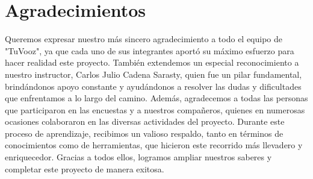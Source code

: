 \documentclass[12pt, a4paper, twocolumn]{article}
\begin{document}
\section{Agradecimientos}
Queremos expresar nuestro más sincero agradecimiento a todo el equipo de "TuVooz", ya que cada uno de sus integrantes aportó su máximo esfuerzo para hacer realidad este proyecto. También extendemos un especial reconocimiento a nuestro instructor, Carlos Julio Cadena Sarasty, quien fue un pilar fundamental, brindándonos apoyo constante y ayudándonos a resolver las dudas y dificultades que enfrentamos a lo largo del camino. 
Además, agradecemos a todas las personas que participaron en las encuestas y a nuestros compañeros, quienes en numerosas ocasiones colaboraron en las diversas actividades del proyecto. Durante este proceso de aprendizaje, recibimos un valioso respaldo, tanto en términos de conocimientos como de herramientas, que hicieron este recorrido más llevadero y enriquecedor. Gracias a todos ellos, logramos ampliar nuestros saberes y completar este proyecto de manera exitosa.




\cite{blasco2023mltools, bugarin2024java, claso2024sordas, communications2024python, fernandez2023python, furios2016apps, gonzalez2022ml, grapheverywhere2019machine, karlerickson2024javaai, mintic2024app, paul2018discapacidad, rivas2024normas, strategic2019ia, sulbaran2021manual ,weisheim2022python}
\end{document}
